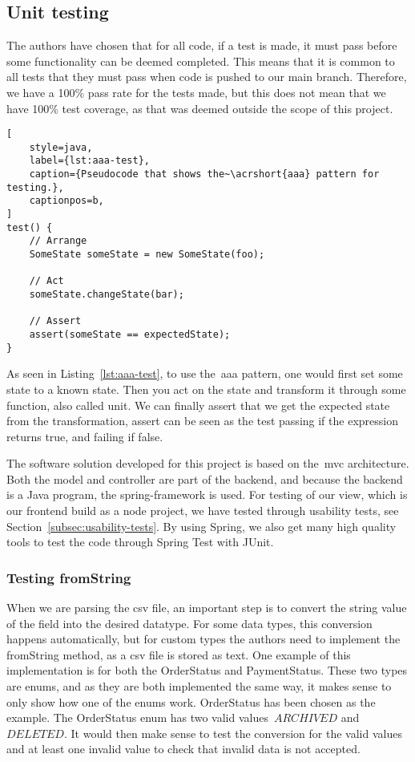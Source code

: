 \subsection{Unit testing}\label{subsec:unit-tests}

The authors have chosen that for all code, if a test is made, it must pass before some functionality can be
deemed completed.
This means that it is common to all tests that they must pass when code is pushed to our main branch.
Therefore, we have a 100\% pass rate for the tests made, but this does not mean that we
have 100\% test coverage, as that was deemed outside the scope of this project.

\begin{lstlisting}[
    style=java,
    label={lst:aaa-test},
    caption={Pseudocode that shows the~\acrshort{aaa} pattern for testing.},
    captionpos=b,
]
test() {
    // Arrange
    SomeState someState = new SomeState(foo);

    // Act
    someState.changeState(bar);

    // Assert
    assert(someState == expectedState);
}
\end{lstlisting}

As seen in Listing~\ref{lst:aaa-test}, to use the~\acrshort{aaa} pattern,
one would first set some state to a known state.
Then you act on the state and transform it through some function, also called unit.
We can finally assert that we get the expected state from the transformation, assert can be seen
as the test passing if the expression returns true, and failing if false.

The software solution developed for this project is based on the~\acrfull{mvc} architecture.
Both the model and controller are part of the backend, and because the backend is a Java program,
the spring-framework is used.
For testing of our view, which is our frontend build as a node project, we have tested through usability tests,
see Section~\ref{subsec:usability-tests}.
By using Spring, we also get many high quality tools to test the code through Spring Test with JUnit.

\subsubsection{Testing fromString}\label{subsubsec:fromstring-unit-test}

When we are parsing the csv file, an important step is to convert the string value of the field into the desired
datatype.
For some data types, this conversion happens automatically, but for custom types the authors need to implement the
fromString method, as a csv file is stored as text.
One example of this implementation is for both the OrderStatus and PaymentStatus.
These two types are enums, and as they are both implemented the same way, it makes sense to only show how one of the
enums work.
OrderStatus has been chosen as the example.
The OrderStatus enum has two valid values~\(ARCHIVED\) and~\(DELETED\).
It would then make sense to test the conversion for the valid values and at least one invalid value to check that
invalid data is not accepted.

